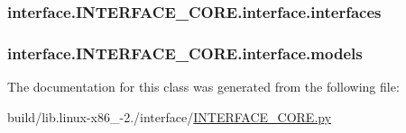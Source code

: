 \subsubsection[{interfaces}]{\setlength{\rightskip}{0pt plus 5cm}interface.\+I\+N\+T\+E\+R\+F\+A\+C\+E\+\_\+\+C\+O\+R\+E.\+interface.\+interfaces}\label{classinterface_1_1INTERFACE__CORE_1_1interface_a360e2dd2c4bc4c873884831bfaa86582}
\hypertarget{classinterface_1_1INTERFACE__CORE_1_1interface_a15823225e3f265a09e00938b28ac12da}{}
\subsubsection[{models}]{\setlength{\rightskip}{0pt plus 5cm}interface.\+I\+N\+T\+E\+R\+F\+A\+C\+E\+\_\+\+C\+O\+R\+E.\+interface.\+models}\label{classinterface_1_1INTERFACE__CORE_1_1interface_a15823225e3f265a09e00938b28ac12da}


The documentation for this class was generated from the following file\+:\begin{DoxyCompactItemize}
\item 
build/lib.\+linux-\/x86\+\_-\/2./interface/\hyperlink{build_2lib_8linux-x86__64-2_87_2interface_2INTERFACE__CORE_8py}{I\+N\+T\+E\+R\+F\+A\+C\+E\+\_\+\+C\+O\+R\+E.\+py}\end{DoxyCompactItemize}
